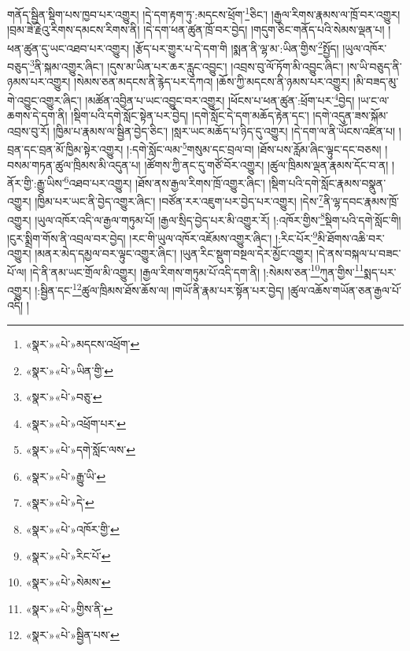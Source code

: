 གནོད་སྦྱིན་སྡིག་པས་ཁྱབ་པར་འགྱུར། །དེ་དག་རྟག་ཏུ་:མདངས་ཕྲོག་\footnote{«སྣར་»«པེ་»མདངས་འཕྲོག་}ཅིང་། །རྒྱལ་རིགས་རྣམས་ལ་ཁྲོ་བར་འགྱུར། །བྲམ་ཟེ་རྗེའུ་རིགས་དམངས་རིགས་ནི། །དེ་དག་ཕན་ཚུན་ཁྲོ་བར་བྱེད། །གདུག་ཅིང་གནོད་པའི་སེམས་ལྡན་པ། །ཕན་ཚུན་དུ་ཡང་འཐབ་པར་འགྱུར། །རྩོད་པར་གྱུར་པ་དེ་དག་གི །སྨན་ནི་ལྷ་མ་:ཡིན་གྱིས་\footnote{«སྣར་»«པེ་»ཡིན་གྱི་}སྤྱོད། །ཡུལ་འཁོར་བཅུད་\footnote{«སྣར་»«པེ་»བཅུ་}ནི་སྐམ་འགྱུར་ཞིང་། །དུས་མ་ཡིན་པར་ཆར་རླུང་འབྱུང་། །འབྲས་བུ་ལོ་ཏོག་མི་འབྱུང་ཞིང་། །ས་ཡི་བཅུད་ནི་ཉམས་པར་འགྱུར། །སེམས་ཅན་མདངས་ནི་རྙེད་པར་དཀའ། །ཆོས་ཀྱི་མདངས་ནི་ཉམས་པར་འགྱུར། །མི་བཟད་མུ་གེ་འབྱུང་འགྱུར་ཞིང་། །མཚོན་འབྱིན་པ་ཡང་འབྱུང་བར་འགྱུར། །ཕོངས་པ་ཕན་ཚུན་:ཕྲོག་པར་\footnote{«སྣར་»«པེ་»འཕྲོག་པར་}བྱེད། །ཡ་ང་ལ་ཆགས་དེ་དག་ནི། །སྡིག་པའི་དགེ་སློང་སྟེན་པར་བྱེད། །དགེ་སློང་དེ་དག་མཆོད་རྟེན་དང་། །དགེ་འདུན་ཟས་སྐོམ་འབྲས་བུ་རོ། །ཁྱིམ་པ་རྣམས་ལ་སྦྱིན་བྱེད་ཅིང་། །སླར་ཡང་མཆོད་པ་ཉིད་དུ་འགྱུར། །དེ་དག་ལ་ནི་ཡོངས་འཛིན་པ། །བྲན་དང་བྲན་མོ་ཁྱིམ་སྟེར་འགྱུར། །:དགེ་སློང་ལམ་\footnote{«སྣར་»«པེ་»དགེ་སློང་ལས་}གསུམ་དང་བྲལ་བ། །ཐོས་པས་རློམ་ཞིང་ལྟུང་དང་བཅས། །བསམ་གཏན་ཚུལ་ཁྲིམས་མི་འདུན་པ། །ཚོགས་ཀྱི་ནང་དུ་གཙོ་བོར་འགྱུར། །ཚུལ་ཁྲིམས་ལྡན་རྣམས་དོང་བ་ན། །ནོར་གྱི་:རྒྱུ་ཡིས་\footnote{«སྣར་»«པེ་»རྒྱུ་ཡི་}འཐབ་པར་འགྱུར། །ཐོས་ནས་རྒྱལ་རིགས་ཁྲོ་འགྱུར་ཞིང་། །སྡིག་པའི་དགེ་སློང་རྣམས་བསྣུན་འགྱུར། །ཁྱིམ་པར་ཡང་ནི་བྱེད་འགྱུར་ཞིང་། །བཙོན་རར་འཇུག་པར་བྱེད་པར་འགྱུར། །དེས་\footnote{«སྣར་»«པེ་»དེ་}ནི་ལྷ་དབང་རྣམས་ཁྲོ་འགྱུར། །ཡུལ་འཁོར་འདི་ལ་རྒྱལ་གཏུམ་པོ། །རྒྱལ་སྲིད་བྱེད་པར་མི་འགྱུར་རོ། །:འཁོར་གྱིས་\footnote{«སྣར་»«པེ་»འཁོར་གྱི་}སྡིག་པའི་དགེ་སློང་གི། །ངུར་སྨྲིག་གོས་ནི་འབྲལ་བར་བྱེད། །རང་གི་ཡུལ་འཁོར་འཇོམས་འགྱུར་ཞིང་། །:རིང་པོར་\footnote{«སྣར་»«པེ་»རིང་པོ་}མི་ཐོགས་འཆི་བར་འགྱུར། །མནར་མེད་དམྱལ་བར་ལྟུང་འགྱུར་ཞིང་། །ཡུན་རིང་སྡུག་བསྔལ་དེར་མྱོང་འགྱུར། །དེ་ནས་བསྐལ་པ་བཟང་པོ་ལ། །དེ་ནི་ནམ་ཡང་གྲོལ་མི་འགྱུར། །རྒྱལ་རིགས་གཏུམ་པོ་འདི་དག་ནི། །:སེམས་ཅན་\footnote{«སྣར་»«པེ་»སེམས་}ཀུན་གྱིས་\footnote{«སྣར་»«པེ་»གྱིས་ནི་}སྨད་པར་འགྱུར། །:སྦྱིན་དང་\footnote{«སྣར་»«པེ་»སྦྱིན་པས་}ཚུལ་ཁྲིམས་ཐོས་ཆོས་ལ། །གཡོ་ནི་རྣམ་པར་སྟོན་པར་བྱེད། །ཚུལ་འཆོས་གཡོན་ཅན་རྒྱལ་པོ་འདི། །
